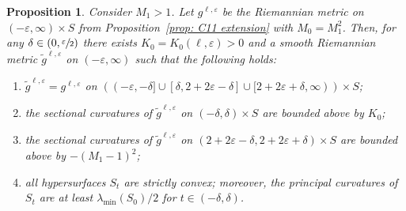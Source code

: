\documentclass[10pt]{amsart}
\newenvironment{enumeratea}
{\bgroup\def\theenumi{\alph{enumi}}\begin{enumerate}}
{\end{enumerate}\egroup}
\newtheorem{proposition}[theorem]{Proposition}
\theoremstyle{definition}
\let\eps\varepsilon
\renewcommand{\>}{{\rangle}}
\newcommand{\<}{{\langle}}
\begin{document}
\begin{proposition}\label{prop: smoothify}
Consider $M_1>1$. Let $g^{\ell,\eps}$ be the Riemannian metric on $(-\eps,\infty)\times S$ from Proposition~\ref{prop: C11 extension} with $M_0=M^2_1$. Then, for any $\delta\in(0,\sfrac{\eps}{2})$ there exists $K_0=K_0(\ell, \eps)>0$ and a smooth Riemannian metric $\tilde g^{\ell,\eps}$ on $(-\eps,\infty)$ such that the following holds:
\begin{enumeratea}
\item\label{prop: smoothifya} $\tilde g^{\ell,\eps}= g^{\ell,\eps}$ on $\left((-\eps,-\delta]\cup [\delta,2+2\eps-\delta]\cup [2+2\eps+\delta,\infty)\right)\times S$;
\item\label{prop: smoothifyb} the sectional curvatures of $\tilde{g}^{\ell,\eps}$ on $(-\delta,\delta)\times S$ are bounded above by $K_0$;
\item\label{prop: smoothifyc} the sectional curvatures of $\tilde{g}^{\ell,\eps}$ on $(2+2\eps-\delta,2+2\eps+\delta)\times S$ are bounded above by $-(M_1-1)^2$;
\item\label{prop: smoothifyd} all hypersurfaces $S_t$ are strictly convex; moreover, the principal curvatures of~$S_t$ are at least $\lambda_{\min}(S_0)/2$ for $t\in(-\delta, \delta)$.
\end{enumeratea}
\end{proposition}
\end{document}

